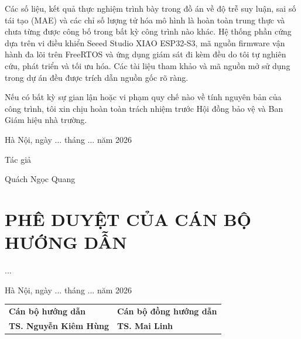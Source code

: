 Các số liệu, kết quả thực nghiệm trình bày trong đồ án về độ trễ suy luận, sai số tái tạo (MAE) và các chỉ số lượng tử hóa mô hình là hoàn toàn trung thực và chưa từng được công bố trong bất kỳ công trình nào khác. Hệ thống phần cứng dựa trên vi điều khiển Seeed Studio XIAO ESP32-S3, mã nguồn firmware vận hành đa lõi trên FreeRTOS và ứng dụng giám sát đi kèm đều do tôi tự nghiên cứu, phát triển và tối ưu hóa. Các tài liệu tham khảo và mã nguồn mở sử dụng trong dự án đều được trích dẫn nguồn gốc rõ ràng.

Nếu có bất kỳ sự gian lận hoặc vi phạm quy chế nào về tính nguyên bản của công trình, tôi xin chịu hoàn toàn trách nhiệm trước Hội đồng bảo vệ và Ban Giám hiệu nhà trường.

\vspace{0.5cm}

\begin{flushright}
    Hà Nội, ngày ... tháng ... năm 2026\par
    Tác giả\hspace*{2.8cm}\par
    \vspace{3.5cm}
    Quách Ngọc Quang\hspace*{1.3cm}
\end{flushright}

\chapter*{PHÊ DUYỆT CỦA CÁN BỘ HƯỚNG DẪN}
\fontsize{13}{15}\selectfont

...

\vspace{1.2cm}

\vfill

\begin{flushright}
    Hà Nội, ngày ... tháng ... năm 2026
\end{flushright}

\vspace{0.6cm}

\noindent
\begin{tabularx}{\textwidth}{>{\centering\arraybackslash}X>{\centering\arraybackslash}X}
    \textbf{Cán bộ hướng dẫn} & \textbf{Cán bộ đồng hướng dẫn} \\[3.4cm]
    \textbf{TS. Nguyễn Kiêm Hùng} & \textbf{TS. Mai Linh}
\end{tabularx}

\vspace{0.8cm}
